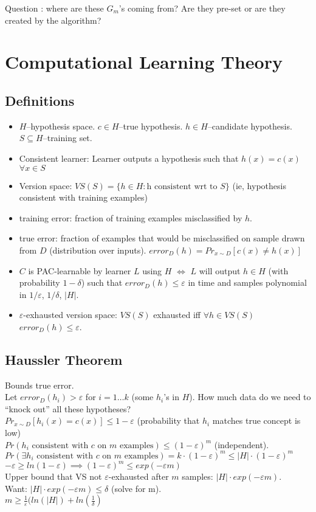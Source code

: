 \documentclass[11pt]{article}
\begin{document}
Question : where are these $G_m$'s coming from? Are they pre-set or are they created by the algorithm?

\section{Computational Learning Theory}
\subsection{Definitions}
\begin{itemize}
\item $H$--hypothesis space. $c \in H$--true hypothesis. $h \in H$--candidate hypothesis. $S \subseteq H$--training set.
\item Consistent learner: Learner outputs a hypothesis such that $h(x) = c(x)$ $\forall x \in S$
\item Version space: $VS(S) = \{ h \in H: $h$ \text{ consistent wrt to } S \}$ (ie, hypothesis consistent with training examples)
\item training error: fraction of training examples misclassified by $h$.
\item true error: fraction of examples that would be misclassified on sample drawn from $D$ (distribution over inputs). $error_D(h) = Pr_{x \sim D} [c(x) \neq h(x)]$
\item $C$ is PAC-learnable by learner $L$ using $H$ $\iff$ $L$ will output $h \in H$ (with probability $1-\delta$) such that $error_D(h) \leq \varepsilon$ in time and samples polynomial in $1/\varepsilon$, $1/ \delta$, $|H|$.
\item $\varepsilon$-exhausted version space: $VS(S)$ exhausted iff $\forall h \in VS(S)$ $error_D(h) \leq \varepsilon$.
\end{itemize}

\subsection{Haussler Theorem}
Bounds true error.\\
Let $error_D(h_i) > \varepsilon$ for $i = 1 \dots k$ (some $h_i$'s in $H$). How much data do we need to ``knock out'' all these hypotheses?\\
$Pr_{x \sim D} [h_i(x) = c(x)] \leq 1- \varepsilon$ (probability that $h_i$ matches true concept is low)\\
$Pr(h_i \text{ consistent with $c$ on $m$ examples}) \leq (1- \varepsilon)^m$ (independent).\\
$Pr(\exists h_i \text{ consistent with $c$ on $m$ examples}) = k \cdot (1- \varepsilon)^m \leq |H| \cdot (1-\varepsilon)^m$\\
$-\varepsilon \geq ln(1- \varepsilon) \implies (1- \varepsilon)^m \leq exp(-\varepsilon m)$\\
Upper bound that VS not $\varepsilon$-exhausted after $m$ samples: $|H|\cdot exp(-\varepsilon m)$.\\
Want: $|H| \cdot exp(-\varepsilon m) \leq \delta$ (solve for m).\\
$m \geq \frac{1}{\varepsilon} (ln(|H|) + ln (\frac{1}{\delta})$
\end{document}
